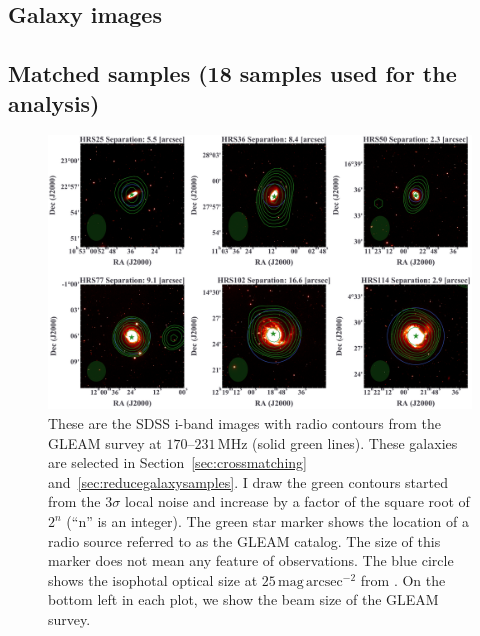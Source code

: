 \documentclass[12pt,a4paper,twoside,openright,final,titlepage]{report}
\newcommand{\mr}[1]{\mathrm{#1}}
\newcommand{\arcs}{\,\mathrm{arcsec}}
\newcommand{\MHz}{\,\mathrm{MHz}}
\begin{document}
\begin{appendices}

\chapter{Galaxy images}\label{chap:galaxyimages}

\section{Matched samples (18 samples used for the analysis)}
\begin{figure}[htbp]
	\centering
	\includegraphics[width=\linewidth]{Figures/AppendixB_galaxyimages.pdf}
    \caption[Galaxy images (6/18 used for the analysis)]{\label{fig:galaxyimages}
        These are the SDSS \citep{Abolfathi2018} i-band images with radio contours from the GLEAM survey at $170\mbox{--}231\MHz$ (solid green lines).
        These galaxies are selected in Section~\ref{sec:crossmatching} and~\ref{sec:reducegalaxysamples}.
        I draw the green contours started from the 3$\sigma$ local noise and increase by a factor of the square root of $2^n$ (``n'' is an integer).
        The green star marker shows the location of a radio source referred to as the GLEAM catalog.
        The size of this marker does not mean any feature of observations.
        The blue circle shows the isophotal optical size at $25\,\mr{mag}\arcs^{-2}$ from \citet{Boselli2010}.
        On the bottom left in each plot, we show the beam size of the GLEAM survey.
    }
\end{figure}


\end{appendices}
\end{document}
